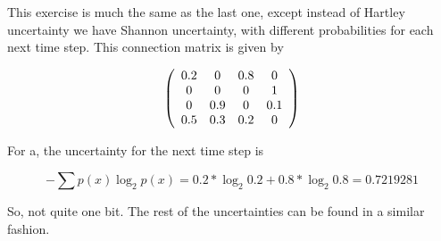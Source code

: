 \documentclass[12pt]{article}
\begin{document}
This exercise is much the same as the last one, except instead of Hartley uncertainty we have Shannon uncertainty, with different probabilities for each next time step.  This connection matrix is given by

\[ \left( \begin{array}{cccc}
0.2 & 0 & 0.8 & 0 \cr
0 & 0 & 0 & 1 \cr
0 & 0.9 & 0 & 0.1 \cr
0.5 & 0.3 & 0.2 & 0 \end{array} \right)\]

For a, the uncertainty for the next time step is 

$$ -\sum{p(x)\log_2{p(x)}}=0.2*\log_2{0.2}+0.8*\log_2{0.8}=0.7219281 $$

So, not quite one bit.  The rest of the uncertainties can be found in a similar fashion.
\end{document}
